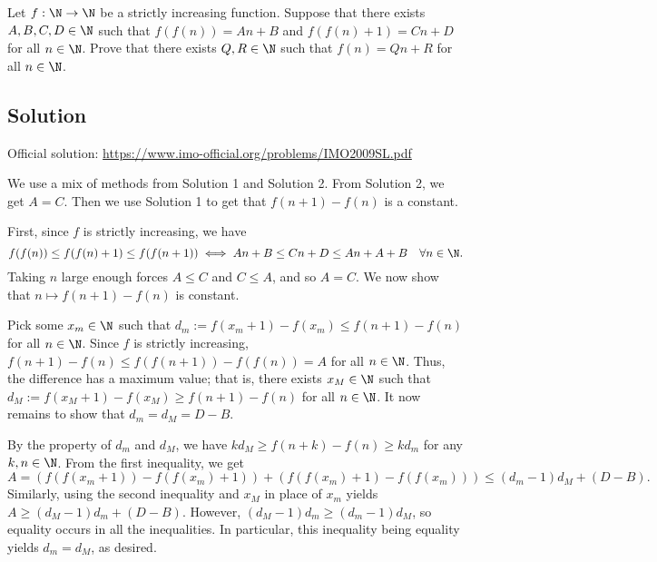 Let $f : \N \to \N$ be a strictly increasing function.
Suppose that there exists $A, B, C, D \in \N$ such that $f(f(n)) = An + B$ and $f(f(n) + 1) = Cn + D$ for all $n \in \N$.
Prove that there exists $Q, R \in \N$ such that $f(n) = Qn + R$ for all $n \in \N$.



\subsection*{Solution}

Official solution: \url{https://www.imo-official.org/problems/IMO2009SL.pdf}

We use a mix of methods from Solution 1 and Solution 2.
From Solution 2, we get $A = C$.
Then we use Solution 1 to get that $f(n + 1) - f(n)$ is a constant.

First, since $f$ is strictly increasing, we have
\[ f(f(n)) \leq f(f(n) + 1) \leq f(f(n + 1)) \iff An + B \leq Cn + D \leq An + A + B \quad \forall n \in \N. \]
Taking $n$ large enough forces $A \leq C$ and $C \leq A$, and so $A = C$.
We now show that $n \mapsto f(n + 1) - f(n)$ is constant.

Pick some $x_m \in \N$ such that $d_m := f(x_m + 1) - f(x_m) \leq f(n + 1) - f(n)$ for all $n \in \N$.
Since $f$ is strictly increasing, $f(n + 1) - f(n) \leq f(f(n + 1)) - f(f(n)) = A$ for all $n \in \N$.
Thus, the difference has a maximum value; that is, there exists $x_M \in \N$ such that $d_M := f(x_M + 1) - f(x_M) \geq f(n + 1) - f(n)$ for all $n \in \N$.
It now remains to show that $d_m = d_M = D - B$.

By the property of $d_m$ and $d_M$, we have $k d_M \geq f(n + k) - f(n) \geq k d_m$ for any $k, n \in \N$.
From the first inequality, we get
\[ A = (f(f(x_m + 1)) - f(f(x_m) + 1)) + (f(f(x_m) + 1) - f(f(x_m))) \leq (d_m - 1) d_M + (D - B). \]
Similarly, using the second inequality and $x_M$ in place of $x_m$ yields $A \geq (d_M - 1) d_m + (D - B)$.
However, $(d_M - 1) d_m \geq (d_m - 1) d_M$, so equality occurs in all the inequalities.
In particular, this inequality being equality yields $d_m = d_M$, as desired.